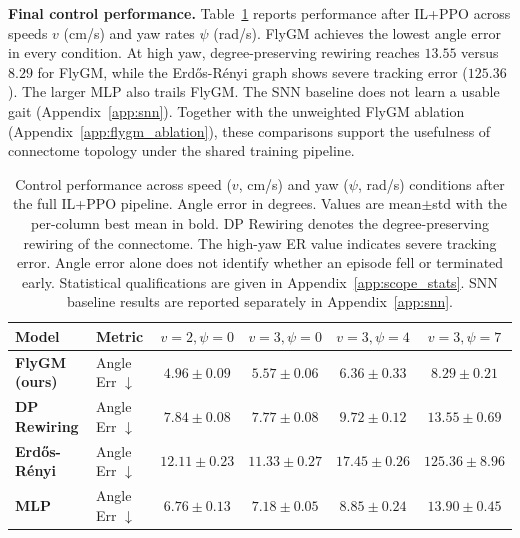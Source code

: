 \documentclass[a4paper]{easychair}
\begin{document}
\textbf{Final control performance.} Table~\ref{tab:topology_reduction} reports performance after IL+PPO across speeds $v$ (cm/s) and yaw rates $\psi$ (rad/s). FlyGM achieves the lowest angle error in every condition. At high yaw, degree-preserving rewiring reaches $13.55$ versus $8.29$ for FlyGM, while the Erd\H{o}s-R\'enyi graph shows severe tracking error ($125.36$). The larger MLP also trails FlyGM. The SNN baseline does not learn a usable gait (Appendix~\ref{app:snn}). Together with the unweighted FlyGM ablation (Appendix~\ref{app:flygm_ablation}), these comparisons support the usefulness of connectome topology under the shared training pipeline.

\begin{table}[htbp]
\centering
\small
\setlength{\tabcolsep}{6pt}
\renewcommand{\arraystretch}{1.1}
\begin{tabular}{ll cccc}
\toprule
\textbf{Model} & \textbf{Metric} & $v{=}2,\psi{=}0$ & $v{=}3,\psi{=}0$ & $v{=}3,\psi{=}4$ & $v{=}3,\psi{=}7$ \\
\midrule
{\textbf{FlyGM (ours)}}
 & Angle Err $\downarrow$ & $\mathbf{4.96{\pm}0.09}$ & $\mathbf{5.57{\pm}0.06}$ & $\mathbf{6.36{\pm}0.33}$ & $\mathbf{8.29{\pm}0.21}$ \\
\midrule
{\textbf{DP Rewiring}}
 & Angle Err $\downarrow$ & $7.84{\pm}0.08$ & $7.77{\pm}0.08$ & $9.72{\pm}0.12$ & $13.55{\pm}0.69$ \\
\midrule
{\textbf{Erd\H{o}s-R\'enyi}}
 & Angle Err $\downarrow$ & $12.11{\pm}0.23$ & $11.33{\pm}0.27$ & $17.45{\pm}0.26$ & $125.36{\pm}8.96$ \\
\midrule
{\textbf{MLP}}
 & Angle Err $\downarrow$ & $6.76{\pm}0.13$ & $7.18{\pm}0.05$ & $8.85{\pm}0.24$ & $13.90{\pm}0.45$ \\
\bottomrule
\end{tabular}
\vspace{2pt}
\caption{Control performance across speed ($v$, cm/s) and yaw ($\psi$, rad/s) conditions after the full IL+PPO pipeline. Angle error in degrees. Values are mean$\pm$std with the per-column best mean in bold. DP Rewiring denotes the degree-preserving rewiring of the connectome. The high-yaw ER value indicates severe tracking error. Angle error alone does not identify whether an episode fell or terminated early. Statistical qualifications are given in Appendix~\ref{app:scope_stats}. SNN baseline results are reported separately in Appendix~\ref{app:snn}.}
\label{tab:topology_reduction}
\end{table}
\end{document}
